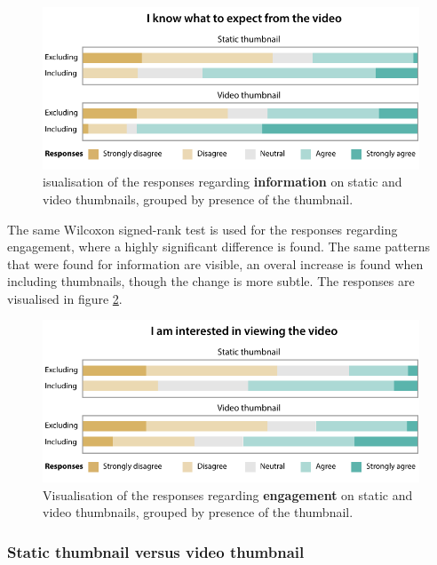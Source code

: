 \documentclass{../resources/sig-alternate-05-2015}
\begin{document}
\begin{figure}[h]
	\includegraphics[width=\linewidth]{resources/information_including_excluding}
	\caption{isualisation of the responses regarding \textbf{information} on static and video thumbnails, grouped by presence of the thumbnail.}
	\label{figure:information including excluding}
\end{figure}

The same Wilcoxon signed-rank test is used for the responses regarding engagement, where a highly significant difference is found. The same patterns that were found for information are visible, an overal increase is found when including thumbnails, though the change is more subtle. The responses are visualised in figure \ref{figure:engagement including excluding}.

\begin{figure}[h!]
	\includegraphics[width=\linewidth]{resources/engagement_including_excluding}
	\caption{Visualisation of the responses regarding \textbf{engagement} on static and video thumbnails, grouped by presence of the thumbnail.}
	\label{figure:engagement including excluding}
\end{figure}

\subsubsection{Static thumbnail versus video thumbnail}
\end{document}
